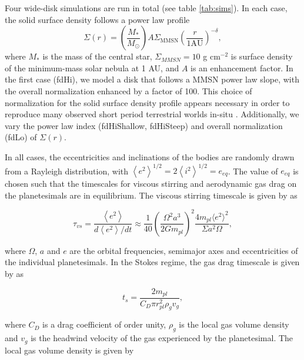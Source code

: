 \documentclass[twocolumn]{aastex63}
\begin{document}
Four wide-disk simulations are run in total (see table \ref{tab:sims}). In each case, the solid surface density follows a power law profile
\begin{equation}
	\Sigma(r) = \left( \frac{M_{*}}{M_{\odot}} \right) A \Sigma_{\mathrm{MMSN}} \left( \frac{r}{1 \mathrm{AU}} \right)^{-\delta},
\end{equation}
where $M_{*}$ is the mass of the central star, $\Sigma_{MMSN} = 10$ g cm$^{-2}$ is surface density of the minimum-mass solar nebula \citep{hayashi81} at 1 AU, and $A$ is an enhancement factor. In the first case (fdHi), we model a disk that follows a MMSN power law slope, with the overall normalization enhanced by a factor of 100. This choice of normalization for the solid surface density profile appears necessary in order to reproduce many observed short period terrestrial worlds in-situ \citep{hansen12}. Additionally, we vary the power law index (fdHiShallow, fdHiSteep) and overall normalization (fdLo) of $\Sigma(r)$.

In all cases, the eccentricities and inclinations of the bodies are randomly drawn from a Rayleigh distribution, with $\left< e^{2} \right>^{1/2} = 2\left<i^{2} \right>^{1/2} = e_{eq}$. The value of $e_{eq}$ is chosen such that the timescales for viscous stirring and aerodynamic gas drag on the planetesimals are in equilibrium. The viscous stirring timescale is given by \citet{ida93} as

\begin{equation}\label{eq:vs_timescale}
    \tau_{vs}  = \frac{\left< e^2 \right>}{d \left< e^2 \right> / dt} \approx \frac{1}{40}\left(\frac{\Omega^{2} a^{3}}{2 G m_{pl}}\right)^{2} \frac{4 m_{pl} \langle e^{2} \rangle^{2}}{\Sigma a^{2} \Omega},
\end{equation}

\noindent where $\Omega$, $a$ and $e$ are the orbital frequencies, semimajor axes and eccentricities of the individual planetesimals. In the Stokes regime, the gas drag timescale is given by \citet{adachi76} as

\begin{equation}\label{eq:ts_stokes}
    t_{s} = \frac{2 m_{pl}}{C_{D} \pi r_{pl}^{2} \rho_{g} v_{g}},
\end{equation}

\noindent where $C_{D}$ is a drag coefficient of order unity, $\rho_{g}$ is the local gas volume density and $v_{g}$ is the headwind velocity of the gas experienced by the planetesimal. The local gas volume density is given by
\end{document}
